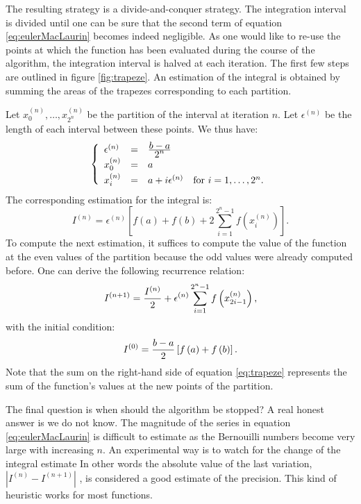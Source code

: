 The resulting strategy is a divide-and-conquer strategy. The
integration interval is divided until one can be sure that the
second term of equation \ref{eq:eulerMacLaurin} becomes indeed
negligible. As one would like to re-use the points at which the
function has been evaluated during the course of the algorithm,
the integration interval is halved at each iteration. The first
few steps are outlined in figure \ref{fig:trapeze}. An estimation
of the integral is obtained by summing the areas of the trapezes
corresponding to each partition.

Let $x_0^{\left(n\right)},\ldots,x_{2^n}^{\left(n\right)}$ be the
partition of the interval at iteration $n$. Let
$\epsilon^{\left(n\right)}$ be the length of each interval between
these points. We thus have:
\begin{equation}
  \left\{
  \begin{array}{lcl}
    \epsilon^{\left(n\right)} & = & {\displaystyle b-a \over\displaystyle 2^n} \\
    x_0^{\left(n\right)} & = & a \\*[0.5ex]
    x_i^{\left(n\right)} & = & a+i\epsilon^{\left(n\right)}
    \mbox{\quad for $i=1,\ldots,2^n$.}
  \end{array}
  \right.
\end{equation}
The corresponding estimation for the integral is:
\begin{equation}
\label{eq:trapezesum}I^{\left(n\right)}=\epsilon^{\left(n\right)}\left[f\left(a\right)+f\left(b\right)+2
\sum_{i=1}^{2^n-1}f\left(x_i^{\left(n\right)}\right)\right] .
\end{equation}
To compute the next estimation, it suffices to compute the value
of the function at the even values of the partition because the
odd values were already computed before. One can derive the
following recurrence relation:
\begin{equation}
\label{eq:trapeze} I^{\left(n+1\right)}={I^{\left(n\right)}\over
2}+ \epsilon^{\left(n\right)}
\sum_{i=1}^{2^n-1}f\left(x_{2i-1}^{\left(n\right)}\right),
\end{equation}
with the initial condition:
\begin{equation}
I^{\left(0\right)}={b-a \over
2}\left[f\left(a\right)+f\left(b\right)\right].
\end{equation}
Note that the sum on the right-hand side of equation
\ref{eq:trapeze} represents the sum of the function's values at
the new points of the partition.

 The final question is when should the
algorithm be stopped? A real honest answer is we do not know. The
magnitude of the series in equation \ref{eq:eulerMacLaurin} is
difficult to estimate as the Bernouilli numbers become very large
with increasing $n$. An experimental way is to watch for the
change of the integral estimate In other words the absolute value
of the last variation,
$\left|I^{\left(n\right)}-I^{\left(n+1\right)}\right|$ , is
considered a good estimate of the precision. This kind of
heuristic works for most functions.

